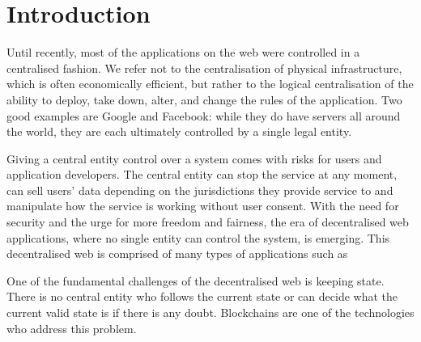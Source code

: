 \section{Introduction}\label{sec:intro}
Until recently, most of the applications on the web were controlled in a centralised fashion.
We refer not to the centralisation of physical infrastructure, which is often economically efficient, but rather to the logical centralisation of the ability to deploy, take down, alter, and change the rules of the application.
Two good examples are Google and Facebook: while they do have servers all around the world, they are each ultimately controlled by a single legal entity.

Giving a central entity control over a system comes with risks for users and application developers.
The central entity can stop the service at any moment, can sell users' data depending on the jurisdictions they provide service to and manipulate how the service is working without user consent.
With the need for security and the urge for more freedom and fairness, the era of decentralised web applications, where no single entity can control the system, is emerging.
This decentralised web is comprised of many types of applications such as 

One of the fundamental challenges of the decentralised web is keeping state. There is no central entity who follows the current state or can decide what the current valid state is if there is any doubt.
Blockchains are one of the technologies who address this problem.

